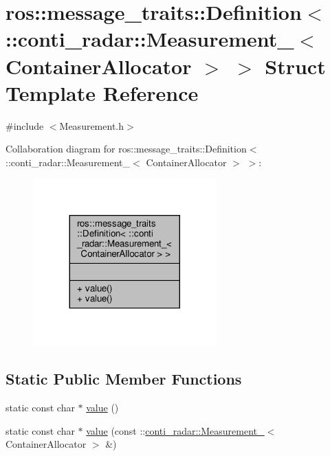 \hypertarget{structros_1_1message__traits_1_1Definition_3_01_1_1conti__radar_1_1Measurement___3_01ContainerAllocator_01_4_01_4}{}\section{ros\+:\+:message\+\_\+traits\+:\+:Definition$<$ \+:\+:conti\+\_\+radar\+:\+:Measurement\+\_\+$<$ Container\+Allocator $>$ $>$ Struct Template Reference}
\label{structros_1_1message__traits_1_1Definition_3_01_1_1conti__radar_1_1Measurement___3_01ContainerAllocator_01_4_01_4}


{\ttfamily \#include $<$Measurement.\+h$>$}



Collaboration diagram for ros\+:\+:message\+\_\+traits\+:\+:Definition$<$ \+:\+:conti\+\_\+radar\+:\+:Measurement\+\_\+$<$ Container\+Allocator $>$ $>$\+:\nopagebreak
\begin{figure}[H]
\begin{center}
\leavevmode
\includegraphics[width=200pt]{d8/d6e/structros_1_1message__traits_1_1Definition_3_01_1_1conti__radar_1_1Measurement___3_01ContainerAllocator_01_4_01_4__coll__graph}
\end{center}
\end{figure}
\subsection*{Static Public Member Functions}
\begin{DoxyCompactItemize}
\item 
static const char $\ast$ \hyperlink{structros_1_1message__traits_1_1Definition_3_01_1_1conti__radar_1_1Measurement___3_01ContainerAllocator_01_4_01_4_af594a7bb54e6fc894d65acdfd0d75a01}{value} ()
\item 
static const char $\ast$ \hyperlink{structros_1_1message__traits_1_1Definition_3_01_1_1conti__radar_1_1Measurement___3_01ContainerAllocator_01_4_01_4_a55d2e29cf99bda2c73cc97a54dafa9e8}{value} (const \+::\hyperlink{structconti__radar_1_1Measurement__}{conti\+\_\+radar\+::\+Measurement\+\_\+}$<$ Container\+Allocator $>$ \&)
\end{DoxyCompactItemize}


